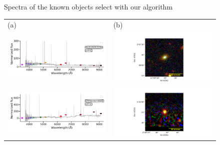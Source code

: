 \documentclass[fleqn,usenatbib]{mnras}
\begin{document}
\begin{figure}
\begin{tabular}{ll}
  \end{tabular}
  \caption{Spectra of the known objects select with our algorithm }
  \label{fig:color-diagram}
\end{figure}

\begin{figure}
  \setlength\tabcolsep{0pt}
  \begin{tabular}{ll}
    (a) & (b) \\
    \includegraphics[trim=10 0 10 20, clip]{Figs/spec-57313-EG220318S020919M01_sp10-173-SPLUS-s03s05-011958.pdf} & \includegraphics[width=0.4\linewidth, trim=10 0 10 20, clip]{Figs/SPLUS-s03s05-011958_329-3_100_r.pdf} \\
     \includegraphics[trim=10 0 10 20, clip]{Figs/spec-55893-F9304_sp15-198-STRIPE82-0057-001810.pdf} & \includegraphics[width=0.4\linewidth, trim=10 0 10 20, clip]{Figs/STRIPE82-0057-001810_39-1_100_r.pdf} \\

\end{tabular}
\end{figure}
\end{document}
